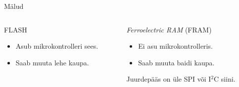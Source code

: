 \documentclass[pdf]{beamer}
\begin{document}
\begin{frame}{Mälud}
	\begin{columns}[t]
		\begin{column}{0.46\textwidth}
			\begin{block}{FLASH}
				\begin{itemize}
					\item Asub mikrokontrolleri sees.
					\item Saab muuta lehe kaupa.
				\end{itemize}
			\end{block}
		\end{column}
		\begin{column}{0.46\textwidth}
			\begin{block}{\textit{Ferroelectric RAM} (FRAM)}
				\begin{itemize}
					\item Ei asu mikrokontrolleris.
					\item Saab muuta baidi kaupa.
				\end{itemize}
				Juurdepääs on üle SPI või I\({}^2\)C siini.
			\end{block}
		\end{column}
	\end{columns}
\end{frame}
\end{document}
